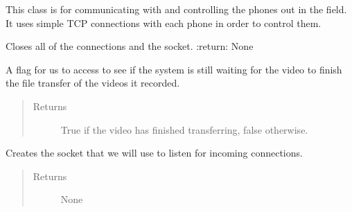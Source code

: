 \documentclass[letterpaper,10pt,english]{sphinxmanual}
\begin{document}
\begin{fulllineitems}
\label{\detokenize{index:src.Controllers.PhoneController.PhoneControl}}
This class is for communicating with and controlling the phones out in the field. It uses simple
TCP connections with each phone in order to control them.

\begin{fulllineitems}
\label{\detokenize{index:src.Controllers.PhoneController.PhoneControl.closeConn}}
Closes all of the connections and the socket.
:return: None

\end{fulllineitems}


\begin{fulllineitems}
\label{\detokenize{index:src.Controllers.PhoneController.PhoneControl.isTransferring}}
A flag for us to access to see if the system is still waiting for the video to finish the file
transfer of the videos it recorded.
\begin{quote}\begin{description}
\item[{Returns}] \leavevmode
True if the video has finished transferring, false otherwise.

\end{description}\end{quote}

\end{fulllineitems}


\begin{fulllineitems}
\label{\detokenize{index:src.Controllers.PhoneController.PhoneControl.setupSocket}}
Creates the socket that we will use to listen for incoming connections.
\begin{quote}\begin{description}
\item[{Returns}] \leavevmode
None


\end{description}
\end{quote}
\end{fulllineitems}
\end{fulllineitems}
\end{document}
